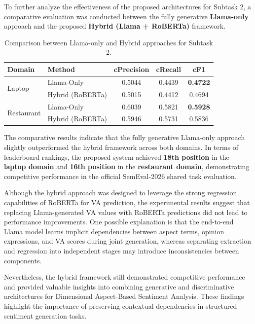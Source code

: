 \documentclass{article}
\begin{document}
To further analyze the effectiveness of the proposed architectures for Subtask 2, a comparative evaluation was conducted between the fully generative \textbf{Llama-only} approach and the proposed \textbf{Hybrid (Llama + RoBERTa)} framework.

\begin{table}[htbp]
\centering
\caption{Comparison between Llama-only and Hybrid approaches for Subtask 2.}
\label{tab:hybrid_comparison}
\begin{tabular}{llccc}
\hline
\textbf{Domain} & \textbf{Method} & \textbf{cPrecision} & \textbf{cRecall} & \textbf{cF1} \\
\hline
\multirow{2}{*}{Laptop}
& Llama-Only & 0.5044 & 0.4439 & \textbf{0.4722} \\
& Hybrid (RoBERTa) & 0.5015 & 0.4412 & 0.4694 \\
\hline
\multirow{2}{*}{Restaurant}
& Llama-Only & 0.6039 & 0.5821 & \textbf{0.5928} \\
& Hybrid (RoBERTa) & 0.5946 & 0.5731 & 0.5836 \\
\hline
\end{tabular}
\end{table}

The comparative results indicate that the fully generative Llama-only approach slightly outperformed the hybrid framework across both domains. In terms of leaderboard rankings, the proposed system achieved \textbf{18th position} in the \textbf{laptop domain} and \textbf{16th position} in the \textbf{restaurant domain}, demonstrating competitive performance in the official SemEval-2026 shared task evaluation.

Although the hybrid approach was designed to leverage the strong regression capabilities of RoBERTa for VA prediction, the experimental results suggest that replacing Llama-generated VA values with RoBERTa predictions did not lead to performance improvements. One possible explanation is that the end-to-end Llama model learns implicit dependencies between aspect terms, opinion expressions, and VA scores during joint generation, whereas separating extraction and regression into independent stages may introduce inconsistencies between components.

Nevertheless, the hybrid framework still demonstrated competitive performance and provided valuable insights into combining generative and discriminative architectures for Dimensional Aspect-Based Sentiment Analysis. These findings highlight the importance of preserving contextual dependencies in structured sentiment generation tasks.
\end{document}
